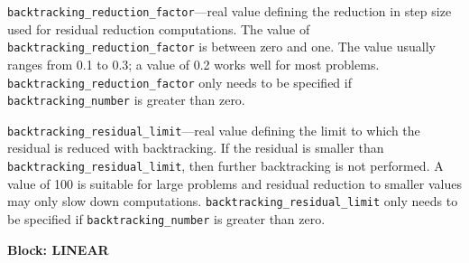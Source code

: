 \begin{description}
\item \texttt{backtracking\_reduction\_factor}---real value defining the reduction in step size used for residual reduction computations. The value of \texttt{backtracking\_reduction\_factor} is between zero and one. The value usually ranges from 0.1 to 0.3; a value of 0.2 works well for most problems. \texttt{backtracking\_reduction\_factor} only needs to be specified if \texttt{backtracking\_number} is greater than zero.

\item \texttt{backtracking\_residual\_limit}---real value defining the limit to which the residual is reduced with backtracking. If the residual is smaller than \texttt{backtracking\_residual\_limit}, then further backtracking is not performed. A value of 100 is suitable for large problems and residual reduction to smaller values may only slow down computations. \texttt{backtracking\_residual\_limit} only needs to be specified if \texttt{backtracking\_number} is greater than zero.

\end{description}
\item \textbf{Block: LINEAR}

